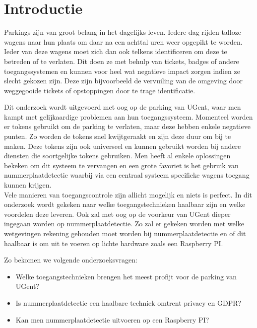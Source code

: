 
\section{Introductie} %
\label{sec:introductie}

Parkings zijn van groot belang in het dagelijks leven. Iedere dag rijden talloze wagens naar hun plaats om daar na een achttal uren weer opgepikt te worden. Ieder van deze wagens moet zich dan ook telkens identificeren om deze te betreden of te verlaten. Dit doen ze met behulp van tickets, badges of andere toegangssystemen en kunnen voor heel wat negatieve impact zorgen indien ze slecht gekozen zijn. Deze zijn bijvoorbeeld de vervuiling van de omgeving door weggegooide tickets of opstoppingen door te trage identificatie.

Dit onderzoek wordt uitgevoerd met oog op de parking van UGent, waar men kampt met gelijkaardige problemen aan hun toegangssysteem. Momenteel worden er tokens gebruikt om de parking te verlaten, maar deze hebben enkele negatieve punten. Zo worden de tokens snel kwijtgeraakt en zijn deze duur om bij te maken. Deze tokens zijn ook universeel en kunnen gebruikt worden bij andere diensten die soortgelijke tokens gebruiken. Men heeft al enkele oplossingen bekeken om dit systeem te vervangen en een grote favoriet is het gebruik van nummerplaatdetectie waarbij via een centraal systeem specifieke wagens toegang kunnen krijgen.
\\
Vele manieren van toegangscontrole zijn allicht mogelijk en niets is perfect. In dit onderzoek wordt gekeken naar welke toegangstechnieken haalbaar zijn en welke voordelen deze leveren. Ook zal met oog op de voorkeur van UGent dieper ingegaan worden op nummerplaatdetectie. Zo zal er gekeken worden met welke wetgevingen rekening gehouden moet worden bij nummerplaatdetectie en of dit haalbaar is om uit te voeren op lichte hardware zoals een Raspberry PI.

Zo bekomen we volgende onderzoeksvragen:
\begin{itemize}
  \item Welke toegangstechnieken brengen het meest profijt voor de parking van UGent?
  \item Is nummerplaatdetectie een haalbare techniek omtrent privacy en GDPR?
  \item Kan men nummerplaatdetectie uitvoeren op een Raspberry PI?
\end{itemize}

